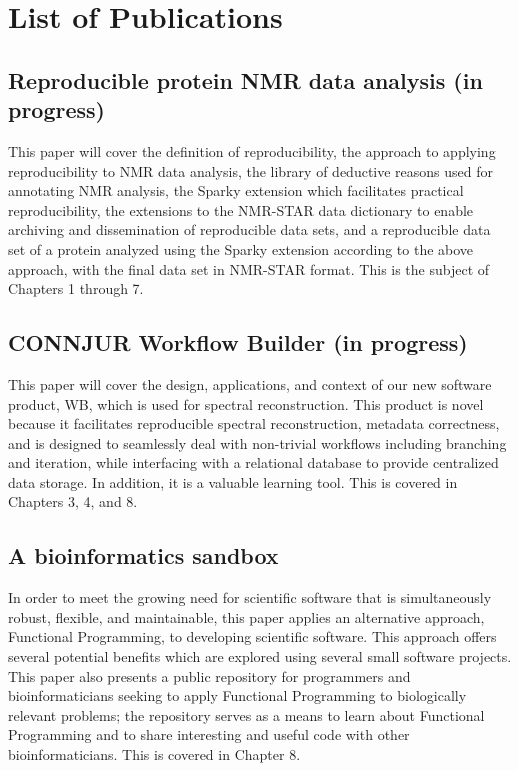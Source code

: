 \chapter{List of Publications}

\section{Reproducible protein NMR data analysis (in progress)}
This paper will cover the definition of reproducibility, the approach to
applying reproducibility to NMR data analysis, the library of deductive
reasons used for annotating NMR analysis, the Sparky extension which 
facilitates practical reproducibility, the extensions to the NMR-STAR
data dictionary to enable archiving and dissemination of reproducible
data sets, and a reproducible data set of a protein analyzed using the Sparky
extension according to the above approach, with the final data set in 
NMR-STAR format.  This is the subject of Chapters 1 through 7.


\section{CONNJUR Workflow Builder (in progress)}
This paper \cite{connjur-wb} will cover the design, applications, and context
of our new software product, WB, which is used for
spectral reconstruction.  This product is novel because it facilitates 
reproducible spectral reconstruction, metadata correctness, and is designed
to seamlessly deal with non-trivial workflows including branching and 
iteration, while interfacing with a relational database to provide centralized
data storage.  In addition, it is a valuable learning tool.  This is covered
in Chapters 3, 4, and 8.


\section{A bioinformatics sandbox}
In order to meet the growing need for scientific software that is 
simultaneously robust, flexible, and maintainable, this paper 
\cite{fenwick2012} applies an alternative approach, Functional Programming,
to developing scientific software.  This approach offers several potential
benefits which are explored using several small software projects. 
This paper also presents a public repository for programmers and bioinformaticians 
seeking to apply Functional Programming to biologically relevant problems; the
repository serves as a means to learn about Functional Programming and to share
interesting and useful code with other bioinformaticians.
This is covered in Chapter 8.


